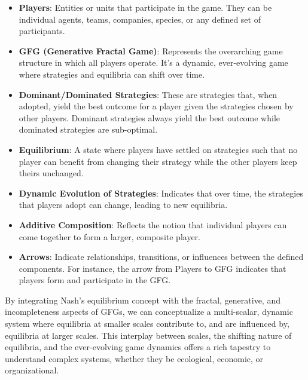\documentclass{article}
\begin{document}
\begin{itemize}
    \item \textbf{Players}: Entities or units that participate in the game. They can be individual agents, teams, companies, species, or any defined set of participants.
    
    \item \textbf{GFG (Generative Fractal Game)}: Represents the overarching game structure in which all players operate. It's a dynamic, ever-evolving game where strategies and equilibria can shift over time. 
    
    \item \textbf{Dominant/Dominated Strategies}: These are strategies that, when adopted, yield the best outcome for a player given the strategies chosen by other players. Dominant strategies always yield the best outcome while dominated strategies are sub-optimal.
    
    \item \textbf{Equilibrium}: A state where players have settled on strategies such that no player can benefit from changing their strategy while the other players keep theirs unchanged.
    
    \item \textbf{Dynamic Evolution of Strategies}: Indicates that over time, the strategies that players adopt can change, leading to new equilibria.
    
    \item \textbf{Additive Composition}: Reflects the notion that individual players can come together to form a larger, composite player.
    
    \item \textbf{Arrows}: Indicate relationships, transitions, or influences between the defined components. For instance, the arrow from Players to GFG indicates that players form and participate in the GFG.
\end{itemize}

\bigskip

By integrating Nash's equilibrium concept with the fractal, generative, and incompleteness aspects of GFGs, we can conceptualize a multi-scalar, dynamic system where equilibria at smaller scales contribute to, and are influenced by, equilibria at larger scales. This interplay between scales, the shifting nature of equilibria, and the ever-evolving game dynamics offers a rich tapestry to understand complex systems, whether they be ecological, economic, or organizational.


\end{document}
